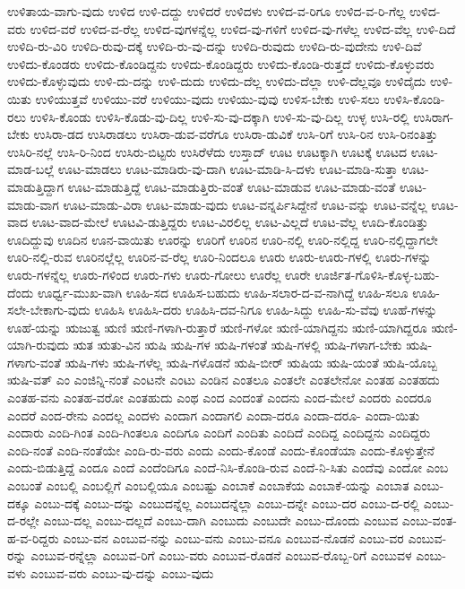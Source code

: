 {ಉಳಿತಾಯ-ವಾಗು-ವುದು
ಉಳಿದ
ಉಳಿ-ದದ್ದು
ಉಳಿದರೆ
ಉಳಿದಳು
ಉಳಿದ-ವ-ರಿಗೂ
ಉಳಿದ-ವ-ರಿ-ಗೆಲ್ಲ
ಉಳಿದ-ವರು
ಉಳಿದ-ವರೆ
ಉಳಿದ-ವ-ರೆಲ್ಲ
ಉಳಿದ-ವುಗಳನ್ನೆಲ್ಲ
ಉಳಿದ-ವು-ಗಳಿಗೆ
ಉಳಿದ-ವು-ಗಳೆಲ್ಲ
ಉಳಿದ-ವೆಲ್ಲ
ಉಳಿ-ದಿದೆ
ಉಳಿದಿ-ರು-ವಿರಿ
ಉಳಿದಿ-ರುವು-ದಕ್ಕೆ
ಉಳಿದಿ-ರು-ವು-ದನ್ನು
ಉಳಿದಿ-ರುವುದು
ಉಳಿದಿ-ರು-ವುದೇನು
ಉಳಿ-ದಿವೆ
ಉಳಿದು-ಕೊಂಡರು
ಉಳಿದು-ಕೊಂಡಿದ್ದನು
ಉಳಿದು-ಕೊಂಡಿದ್ದರು
ಉಳಿದು-ಕೊಂಡಿ-ರುತ್ತದೆ
ಉಳಿದು-ಕೊಳ್ಳುವರು
ಉಳಿದು-ಕೊಳ್ಳುವುದು
ಉಳಿ-ದು-ದನ್ನು
ಉಳಿ-ದುದು
ಉಳಿದು-ದೆಲ್ಲ
ಉಳಿದು-ದೆಲ್ಲಾ
ಉಳಿ-ದೆಲ್ಲವೂ
ಉಳಿದೈದು
ಉಳಿ-ಯಿತು
ಉಳಿಯುತ್ತವೆ
ಉಳಿಯು-ವರೆ
ಉಳಿಯು-ವುದು
ಉಳಿಯು-ವುವು
ಉಳಿಸ-ಬೇಕು
ಉಳಿ-ಸಲು
ಉಳಿಸಿ-ಕೊಂಡಿ-ರಲು
ಉಳಿಸಿ-ಕೊಂಡು
ಉಳಿಸಿ-ಕೊಡು-ವು-ದಿಲ್ಲ
ಉಳಿ-ಸು-ವು-ದಕ್ಕಾಗಿ
ಉಳಿ-ಸು-ವು-ದಿಲ್ಲ
ಉಳ್ಳ
ಉಸಿ-ರಲ್ಲಿ
ಉಸಿರಾಗ-ಬೇಕು
ಉಸಿರಾ-ಡದ
ಉಸಿರಾಡಲು
ಉಸಿರಾ-ಡುವ-ವರೆಗೂ
ಉಸಿರಾ-ಡುವಿಕೆ
ಉಸಿ-ರಿಗೆ
ಉಸಿ-ರಿನ
ಉಸಿ-ರಿನಂತಿತ್ತು
ಉಸಿರಿ-ನಲ್ಲೆ
ಉಸಿ-ರಿ-ನಿಂದ
ಉಸಿರು-ಬಿಟ್ಟರು
ಉಸಿರೆಳೆದು
ಉಸ್ತಾದ್
ಊಟ
ಊಟಕ್ಕಾಗಿ
ಊಟಕ್ಕೆ
ಊಟದ
ಊಟ-ಮಾಡ-ಬಲ್ಲೆ
ಊಟ-ಮಾಡಲು
ಊಟ-ಮಾಡಿರು-ವು-ದಾಗಿ
ಊಟ-ಮಾಡಿ-ಸಿ-ದಳು
ಊಟ-ಮಾಡಿ-ಸುತ್ತಾ
ಊಟ-ಮಾಡುತ್ತಿದ್ದಾಗ
ಊಟ-ಮಾಡುತ್ತಿದ್ದೆ
ಊಟ-ಮಾಡುತ್ತಿರು-ವಂತೆ
ಊಟ-ಮಾಡುವ
ಊಟ-ಮಾಡು-ವಂತೆ
ಊಟ-ಮಾಡು-ವಾಗ
ಊಟ-ಮಾಡು-ವಿರಾ
ಊಟ-ಮಾಡು-ವುದು
ಊಟ-ವನ್ನರ್ಪಿಸಿದ್ದೇನೆ
ಊಟ-ವನ್ನು
ಊಟ-ವನ್ನೆಲ್ಲ
ಊಟ-ವಾದ
ಊಟ-ವಾದ-ಮೇಲೆ
ಊಟವಿ-ಡುತ್ತಿದ್ದರು
ಊಟ-ವಿರಲಿಲ್ಲ
ಊಟ-ವಿಲ್ಲದೆ
ಊಟ-ವೆಲ್ಲ
ಊದಿ-ಕೊಂಡಿತ್ತು
ಊದಿದ್ದುವು
ಊದಿನ
ಊನ-ವಾಯಿತು
ಊರನ್ನು
ಊರಿಗೆ
ಊರಿನ
ಊರಿ-ನಲ್ಲಿ
ಊರಿ-ನಲ್ಲಿದ್ದ
ಊರಿ-ನಲ್ಲಿದ್ದಾಗಲೇ
ಊರಿ-ನಲ್ಲಿ-ರುವ
ಊರಿನಲ್ಲೆಲ್ಲ
ಊರಿನ-ವ-ರೆಲ್ಲ
ಊರಿ-ನಿಂದಲೂ
ಊರು
ಊರು-ಊರು-ಗಳಲ್ಲಿ
ಊರು-ಗಳನ್ನು
ಊರು-ಗಳನ್ನೆಲ್ಲ
ಊರು-ಗಳಿಂದ
ಊರು-ಗಳು
ಊರು-ಗೋಲು
ಊರೆಲ್ಲ
ಊರೇ
ಊರ್ಜಿತ-ಗೊಳಿಸಿ-ಕೊಳ್ಳ-ಬಹು-ದೆಂದು
ಊರ್ಧ್ವ-ಮುಖ-ವಾಗಿ
ಊಹಿ-ಸದ
ಊಹಿಸ-ಬಹುದು
ಊಹಿ-ಸಲಾರ-ದ-ವ-ನಾಗಿದ್ದೆ
ಊಹಿ-ಸಲೂ
ಊಹಿ-ಸಲೇ-ಬೇಕಾಗು-ವುದು
ಊಹಿಸಿ
ಊಹಿಸಿ-ದರು
ಊಹಿಸಿ-ದವ-ನಿಗೂ
ಊಹಿ-ಸಿದ್ದು
ಊಹಿ-ಸು-ವೆವು
ಊಹೆ-ಗಳನ್ನು
ಊಹೆ-ಯನ್ನು
ಋಜುತ್ವ
ಋಣಿ
ಋಣಿ-ಗಳಾಗಿ-ರುತ್ತಾರೆ
ಋಣಿ-ಗಳೋ
ಋಣಿ-ಯಾಗಿದ್ದನು
ಋಣಿ-ಯಾಗಿದ್ದರೂ
ಋಣಿ-ಯಾಗಿ-ರುವುದು
ಋತ
ಋತು-ವಿನ
ಋಷಿ
ಋಷಿ-ಗಳ
ಋಷಿ-ಗಳಂತೆ
ಋಷಿ-ಗಳಲ್ಲಿ
ಋಷಿ-ಗಳಾಗ-ಬೇಕು
ಋಷಿ-ಗಳಾಗು-ವಂತೆ
ಋಷಿ-ಗಳು
ಋಷಿ-ಗಳೆಲ್ಲ
ಋಷಿ-ಗಳೊಡನೆ
ಋಷಿ-ಬೀರ್
ಋಷಿಯ
ಋಷಿ-ಯಂತೆ
ಋಷಿ-ಯೊಬ್ಬ
ಋಷಿ-ವತ್
ಎಂ
ಎಂಜಿನ್ನಿ-ನಂತೆ
ಎಂಟನೇ
ಎಂಟು
ಎಂಡಿನ
ಎಂತಲೂ
ಎಂತಲೇ
ಎಂತಲೇನೋ
ಎಂತಹ
ಎಂತಹದು
ಎಂತಹ-ವನು
ಎಂತಹ-ವರೋ
ಎಂತಹುದು
ಎಂಥ
ಎಂದ
ಎಂದಂತೆ
ಎಂದನು
ಎಂದ-ಮೇಲೆ
ಎಂದರು
ಎಂದರೂ
ಎಂದರೆ
ಎಂದ-ರೇನು
ಎಂದಲ್ಲ
ಎಂದಳು
ಎಂದಾಗ
ಎಂದಾಗಲಿ
ಎಂದಾ-ದರೂ
ಎಂದಾ-ದರೂ-
ಎಂದಾ-ಯಿತು
ಎಂದಾರು
ಎಂದಿ-ಗಿಂತ
ಎಂದಿ-ಗಿಂತಲೂ
ಎಂದಿಗೂ
ಎಂದಿಗೆ
ಎಂದಿತು
ಎಂದಿದೆ
ಎಂದಿದ್ದ
ಎಂದಿದ್ದನು
ಎಂದಿದ್ದರು
ಎಂದಿ-ನಂತೆ
ಎಂದಿ-ನಂತೆಯೇ
ಎಂದಿ-ರು-ವರು
ಎಂದು
ಎಂದು-ಕೊಂಡೆ
ಎಂದು-ಕೊಂಡೆಯಾ
ಎಂದು-ಕೊಳ್ಳುತ್ತೇನೆ
ಎಂದು-ಬಿಡುತ್ತಿದ್ದೆ
ಎಂದೂ
ಎಂದೆ
ಎಂದೆಂದಿಗೂ
ಎಂದೆ-ನಿಸಿ-ಕೊಂಡಿ-ರುವ
ಎಂದೆ-ನಿ-ಸಿತು
ಎಂದೆವು
ಎಂದೋ
ಎಂಬ
ಎಂಬಂತೆ
ಎಂಬಲ್ಲಿ
ಎಂಬಲ್ಲಿಗೆ
ಎಂಬಲ್ಲಿಯೂ
ಎಂಬಷ್ಟು
ಎಂಬಾಕೆ
ಎಂಬಾಕೆಯ
ಎಂಬಾಕೆ-ಯನ್ನು
ಎಂಬಾತ
ಎಂಬು-ದಕ್ಕೂ
ಎಂಬು-ದಕ್ಕೆ
ಎಂಬು-ದನ್ನು
ಎಂಬುದನ್ನೆಲ್ಲ
ಎಂಬುದನ್ನೆಲ್ಲಾ
ಎಂಬು-ದನ್ನೇ
ಎಂಬು-ದರ
ಎಂಬು-ದ-ರಲ್ಲಿ
ಎಂಬು-ದ-ರಲ್ಲೇ
ಎಂಬು-ದಲ್ಲ
ಎಂಬು-ದಲ್ಲದೆ
ಎಂಬು-ದಾಗಿ
ಎಂಬುದು
ಎಂಬುದೇ
ಎಂಬು-ದೊಂದು
ಎಂಬುವ
ಎಂಬು-ವಂತ-ಹ-ವ-ರಿದ್ದರು
ಎಂಬು-ವನ
ಎಂಬುವ-ನನ್ನು
ಎಂಬು-ವನು
ಎಂಬು-ವನೂ
ಎಂಬುವ-ನೊಡನೆ
ಎಂಬು-ವರ
ಎಂಬುವ-ರನ್ನು
ಎಂಬುವ-ರನ್ನೆಲ್ಲಾ
ಎಂಬುವ-ರಿಗೆ
ಎಂಬು-ವರು
ಎಂಬುವ-ರೊಡನೆ
ಎಂಬುವ-ರೊಬ್ಬ-ರಿಗೆ
ಎಂಬುವಳ
ಎಂಬು-ವಳು
ಎಂಬುವ-ವರು
ಎಂಬು-ವು-ದನ್ನು
ಎಂಬು-ವುದು
}
